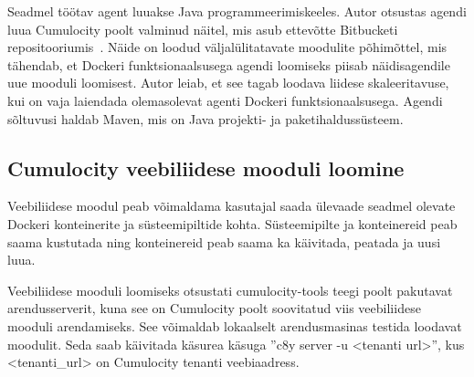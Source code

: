 \documentclass[12pt]{article}
\begin{document}
  Seadmel töötav agent luuakse Java programmeerimiskeeles. Autor otsustas agendi luua Cumulocity
  poolt valminud näitel, mis asub ettevõtte Bitbucketi repositooriumis~\cite{cumulocityExamplesRepository}.
  Näide on loodud
  väljalülitatavate moodulite põhimõttel, mis tähendab, et Dockeri funktsionaalsusega agendi
  loomiseks piisab näidisagendile uue mooduli loomisest. Autor leiab, et see tagab loodava liidese
  skaleeritavuse, kui on vaja laiendada olemasolevat agenti Dockeri funktsionaalsusega.
  Agendi
  sõltuvusi haldab Maven, mis on Java projekti- ja paketihaldussüsteem.
  
 
  
 
 
 
  \subsection{Cumulocity veebiliidese mooduli loomine}
 
  Veebiliidese moodul peab võimaldama kasutajal saada ülevaade seadmel olevate Dockeri
  konteinerite ja süsteemipiltide kohta. Süsteemipilte ja konteinereid peab saama kustutada
  ning konteinereid peab saama ka käivitada, peatada ja uusi luua.
 
  Veebiliidese mooduli loomiseks otsustati cumulocity-tools teegi poolt pakutavat arendusserverit,
  kuna see on Cumulocity poolt soovitatud viis veebiliidese mooduli arendamiseks.
  See võimaldab lokaalselt arendusmasinas testida loodavat moodulit. Seda saab käivitada
  käsurea käsuga ''c8y server -u <tenanti url>'', kus <tenanti\_url> on Cumulocity tenanti
  veebiaadress.
 
\end{document}
